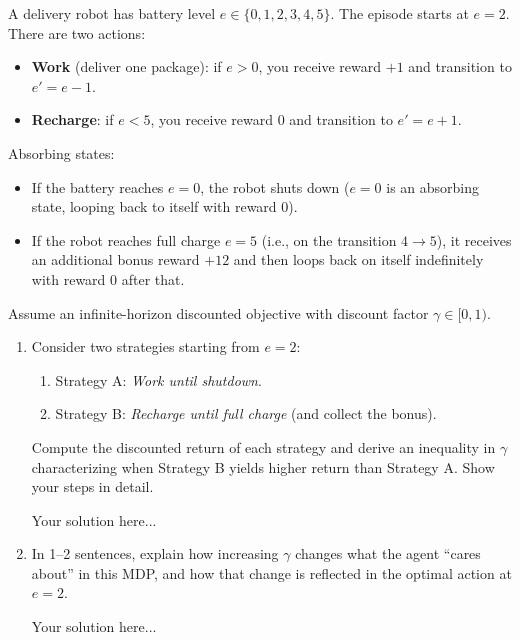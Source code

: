 \documentclass[12pt]{article}
\begin{document}
    A delivery robot has battery level $e \in \{0,1,2,3,4,5\}$. The episode starts at $e=2$. There are two actions:
    
    \begin{itemize}
      \item \textbf{Work} (deliver one package): if $e>0$, you receive reward $+1$ and transition to $e' = e-1$.
      \item \textbf{Recharge}: if $e<5$, you receive reward $0$ and transition to $e' = e+1$.
    \end{itemize}
    
    Absorbing states:
    \begin{itemize}
      \item If the battery reaches $e=0$, the robot shuts down ($e=0$ is an absorbing state, looping back to itself with reward $0$).
      \item If the robot reaches full charge $e=5$ (i.e., on the transition $4 \to 5$), it receives an additional bonus reward $+12$ and then loops back on itself indefinitely with reward $0$ after that.
    \end{itemize}

    
    Assume an infinite-horizon discounted objective with discount factor $\gamma \in [0,1)$.
    
    \begin{enumerate}
      \item[(a)] Consider two strategies starting from $e=2$:
      \begin{enumerate}
        \item Strategy A: \emph{Work until shutdown}.
        \item Strategy B: \emph{Recharge until full charge} (and collect the bonus).
      \end{enumerate}
      Compute the discounted return of each strategy and derive an inequality in $\gamma$ characterizing when Strategy B yields higher return than Strategy A. Show your steps in detail.
      \begin{solution}
        Your solution here...
    \end{solution}
    
      \item[(c)] In 1--2 sentences, explain how increasing $\gamma$ changes what the agent ``cares about'' in this MDP, and how that change is reflected in the optimal action at $e=2$.
      
      \begin{solution}
        Your solution here...
    \end{solution}
    \end{enumerate}
    
\end{document}
